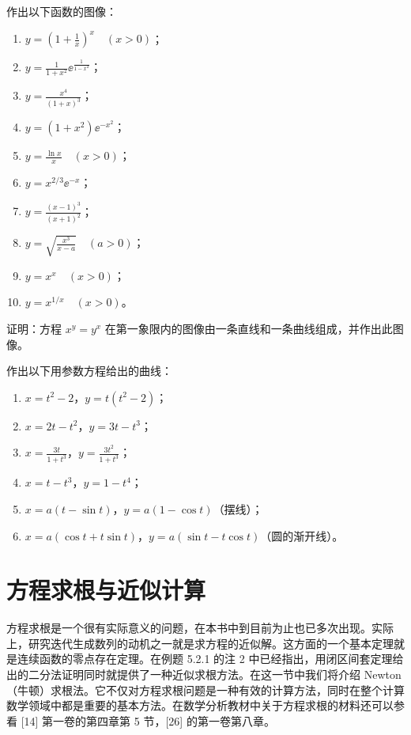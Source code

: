 \begin{xexercise}[3]
作出以下函数的图像：
  \begin{enumerate}[label=(\arabic*)]
    \item $\displaystyle y=\left(1+\frac1x\right)^x\quad(x>0)$；
    \item $\displaystyle y=\frac1{1+x^2}\ee^{\frac1{1-x^2}}$；
    \item $\displaystyle y=\frac{x^4}{(1+x)^3}$；
    \item $\displaystyle y=(1+x^2)\ee^{-x^2}$；
    \item $\displaystyle y=\frac{\ln x}{x}\quad(x>0)$；
    \item $\displaystyle y=x^{2/3}\ee^{-x}$；
    \item $\displaystyle y=\frac{(x-1)^3}{(x+1)^2}$；
    \item $\displaystyle y=\sqrt{\frac{x^3}{x-a}}\quad(a>0)$；
    \item $y=x^x\quad(x>0)$；
    \item $y=x^{1/x}\quad(x>0)$。
  \end{enumerate}
\end{xexercise}

\begin{xexercise}[4]
证明：方程 $x^y=y^x$ 在第一象限内的图像由一条直线和一条曲线组成，并作出此图像。
\end{xexercise}

\begin{xexercise}[5]
作出以下用参数方程给出的曲线：
  \begin{enumerate}[label=(\arabic*)]
    \item $x=t^2-2$，$y=t(t^2-2)$；
    \item $x=2t-t^2$，$y=3t-t^3$；
    \item $\displaystyle x=\frac{3t}{1+t^3}$，$\displaystyle y=\frac{3t^2}{1+t^3}$；
    \item $x=t-t^3$，$y=1-t^4$；
    \item $x=a(t-\sin t)$，$y=a(1-\cos t)$（摆线）；
    \item $x=a(\cos t+t\sin t)$，$y=a(\sin t-t\cos t)$（圆的渐开线）。
  \end{enumerate}
\end{xexercise}

\section{方程求根与近似计算}

方程求根是一个很有实际意义的问题，在本书中到目前为止也已多次出现。实际上，研究迭代生成数列的动机之一就是求方程的近似解。这方面的一个基本定理就是连续函数的零点存在定理。在例题 5.2.1 的注 2 中已经指出，用闭区间套定理给出的二分法证明同时就提供了一种近似求根方法。在这一节中我们将介绍 Newton（牛顿）求根法。它不仅对方程求根问题是一种有效的计算方法，同时在整个计算数学领域中都是重要的基本方法。在数学分析教材中关于方程求根的材料还可以参看 [14] 第一卷的第四章第 5 节，[26] 的第一卷第八章。

